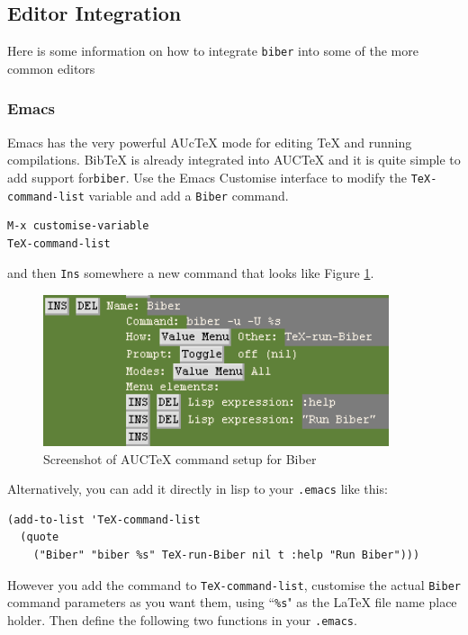 \documentclass{ltxdockit}
\begin{document}
\subsection{Editor Integration}

Here is some information on how to integrate \verb+biber+ into some of the
more common editors

\subsubsection{Emacs}

Emacs has the very powerful AUcTeX mode for editing TeX and running
compilations. BibTeX is already integrated into AUCTeX and it is quite
simple to add support for\verb+biber+. Use the Emacs Customise interface to
modify the \verb+TeX-command-list+ variable and add a \verb+Biber+ command.

\begin{verbatim}
M-x customise-variable
TeX-command-list
\end{verbatim}

\noindent and then \verb+Ins+ somewhere a new command that looks like
Figure \ref{fig:biber-auctex}.

\begin{figure}[!htbp]
  \centering
  \includegraphics[width=4in,keepaspectratio=true]{biber-auctex.png}
  \caption{Screenshot of AUCTeX command setup for Biber}
  \label{fig:biber-auctex}
\end{figure}

\noindent Alternatively, you can add it directly in lisp to your \verb+.emacs+ like
this:

\begin{verbatim}
(add-to-list 'TeX-command-list
  (quote
    ("Biber" "biber %s" TeX-run-Biber nil t :help "Run Biber")))
\end{verbatim}

\noindent However you add the command to \verb+TeX-command-list+, customise the
actual \verb+Biber+ command parameters as you want them, using ``\verb+%s+" as
the LaTeX file name place holder. Then define the following two functions
in your \verb+.emacs+.
\end{document}
